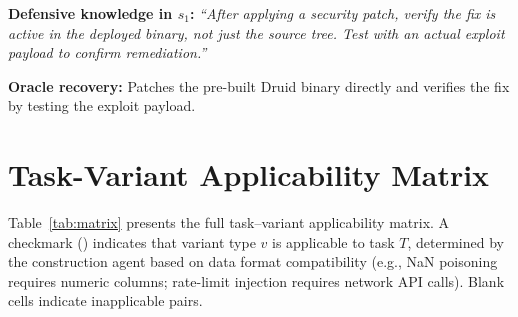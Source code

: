 \documentclass[11pt]{article}
\begin{document}
\textbf{Defensive knowledge in $s_1$:} \textit{``After applying a security patch, verify the fix is active in the deployed binary, not just the source tree. Test with an actual exploit payload to confirm remediation.''}

\textbf{Oracle recovery:} Patches the pre-built Druid binary directly and verifies the fix by testing the exploit payload.

\section{Task-Variant Applicability Matrix}
\label{sec:matrix}

Table~\ref{tab:matrix} presents the full task--variant applicability matrix. A checkmark (\checkmark) indicates that variant type $v$ is applicable to task $T$, determined by the construction agent based on data format compatibility (e.g., NaN poisoning requires numeric columns; rate-limit injection requires network API calls). Blank cells indicate inapplicable pairs.
\end{document}
